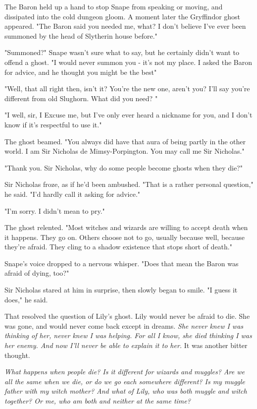 The Baron held up a hand to stop Snape from speaking or moving, and dissipated into the cold dungeon gloom. A moment later the Gryffindor ghost appeared. "The Baron said you needed me, what? I don't believe I've ever been summoned by the head of Slytherin house before."

"Summoned?" Snape wasn't sure what to say, but he certainly didn't want to offend a ghost. "I would never summon you - it's not my place. I asked the Baron for advice, and he thought you might be the best{\el}"

"Well, that all right then, isn't it? You're the new one, aren't you? I'll say you're different from old Slughorn. What did you need? "

"I{\el} well, sir, I{\el} Excuse me, but I've only ever heard a nickname for you, and I don't know if it's respectful to use it."

The ghost beamed. "You always did have that aura of being partly in the other world. I am Sir Nicholas de Mimsy-Porpington. You may call me Sir Nicholas."

"Thank you. Sir Nicholas, why do some people become ghosts when they die?"

Sir Nicholas froze, as if he'd been ambushed. "That is a rather personal question," he said. "I'd hardly call it asking for advice."

"I'm sorry. I didn't mean to pry."

The ghost relented. "Most witches and wizards are willing to accept death when it happens. They go on. Others choose not to go, usually because{\el} well, because they're afraid. They cling to a shadow existence that stops short of death."

Snape's voice dropped to a nervous whisper. "Does that mean the Baron was afraid of dying, too?"

Sir Nicholas stared at him in surprise, then slowly began to smile. "I guess it does," he said.

That resolved the question of Lily's ghost. Lily would never be afraid to die. She was gone, and would never come back except in dreams. \emph{She never knew I was thinking of her, never knew I was helping. For all I know, she died thinking I was her enemy. And now I'll never be able to explain it to her.} It was another bitter thought.

\emph{What happens when people die? Is it different for wizards and muggles? Are we all the same when we die, or do we go each somewhere different? Is my muggle father with my witch mother? And what of Lily, who was both muggle and witch together? Or me, who am both and neither at the same time?}

